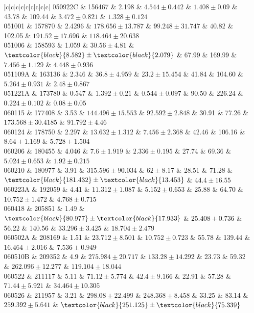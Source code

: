 \documentclass[prd,nofootinbib,preprintnumbers,floatfix]{revtex4}  %
\newcommand{\rthis}[1]{\textcolor{black}{#1}}
\begin{document}
\begin{center}
\begin{longtable*}{|c|c|c|c|c|c|c|c|c|}
050922C	&	156467	&	2.198	&	$	4.544	\pm	0.442	$	&	$	1.408	\pm	0.09	$	&	43.78	&	109.44	&	$	3.472	\pm	0.821	$	&	$	1.328	\pm	0.124	$	\\
051001	&	157870	&	2.4296	&	$	178.656	\pm	13.787	$	&	$	99.248	\pm	31.747	$	&	40.82	&	102.05	&	$	191.52	\pm	17.696	$	&	$	118.464	\pm	20.638	$	\\
051006	&	158593	&	1.059	&	$	30.56	\pm	4.81	$	&	$	\rthis{8.582}	\pm	\rthis{2.079}	$	&	67.99	&	169.99	&	$	7.456	\pm	1.129	$	&	$	4.448	\pm	0.936	$	\\
051109A	&	163136	&	2.346	&	$	36.8	\pm	4.959	$	&	$	23.2	\pm	15.454	$	&	41.84	&	104.60	&	$	5.264	\pm	0.931	$	&	$	2.48	\pm	0.867	$	\\
051221A	&	173780	&	0.547	&	$	1.392	\pm	0.21	$	&	$	0.544	\pm	0.097	$	&	90.50	&	226.24	&	$	0.224	\pm	0.102	$	&	$	0.08	\pm	0.05	$	\\
060115	&	177408	&	3.53	&	$	144.496	\pm	15.553	$	&	$	92.592	\pm	2.848	$	&	30.91	&	77.26	&	$	173.568	\pm	30.4185	$	&	$	91.792	\pm	4.46	$	\\
060124	&	178750	&	2.297	&	$	13.632	\pm	1.312	$	&	$	7.456	\pm	2.368	$	&	42.46	&	106.16	&	$	8.64	\pm	1.169	$	&	$	5.728	\pm	1.504	$	\\
060206	&	180455	&	4.046	&	$	7.6	\pm	1.919	$	&	$	2.336	\pm	0.195	$	&	27.74	&	69.36	&	$	5.024	\pm	0.653	$	&	$	1.92	\pm	0.215	$	\\
060210	&	180977	&	3.91	&	$	315.596	\pm	90.034	$	&	$	62	\pm	8.17	$	&	28.51	&	71.28	&	$	\rthis{181.432}	\pm	\rthis{13.453}	$	&	$	44.4	\pm	16.55	$	\\
060223A	&	192059	&	4.41	&	$	11.312	\pm	1.087	$	&	$	5.152	\pm	0.653	$	&	25.88	&	64.70	&	$	10.752	\pm	1.472	$	&	$	4.768	\pm	0.715	$	\\
060418	&	205851	&	1.49	&	$	\rthis{80.977}	\pm	\rthis{17.933}	$	&	$	25.408	\pm	0.736	$	&	56.22	&	140.56	&	$	33.296	\pm	3.425	$	&	$	18.704	\pm	2.479	$	\\
060502A	&	208169	&	1.51	&	$	23.712	\pm	8.501	$	&	$	10.752	\pm	0.723	$	&	55.78	&	139.44	&	$	16.464	\pm	2.016	$	&	$	7.536	\pm	0.949	$	\\
060510B	&	209352	&	4.9	&	$	275.984	\pm	20.717	$	&	$	133.28	\pm	14.292	$	&	23.73	&	59.32	&	$	262.096	\pm	12.277	$	&	$	119.104	\pm	18.044	$	\\
060522	&	211117	&	5.11	&	$	71.12	\pm	5.774	$	&	$	42.4	\pm	9.166	$	&	22.91	&	57.28	&	$	71.44	\pm	5.921	$	&	$	34.464	\pm	10.305	$	\\
060526	&	211957	&	3.21	&	$	298.08	\pm	22.499	$	&	$	248.368	\pm	8.458	$	&	33.25	&	83.14	&	$	259.392	\pm	5.641	$	&	$	\rthis{251.125}	\pm	\rthis{75.339}	$	\\

\end{longtable*}
\end{center}
\end{document}
